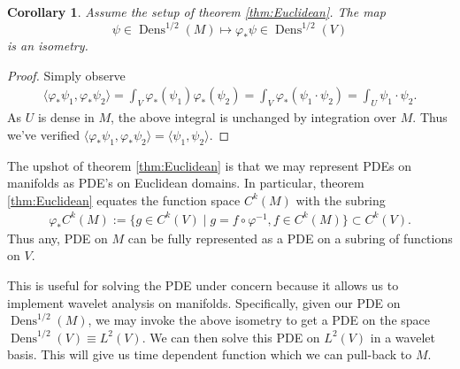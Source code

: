 \documentclass[a4paper, 12 pt]{amsart}
\newcommand{\ram}[1]{\todo[inline,color=red!20]{#1}}
\newcommand{\R}{\mathbb{R}}
\newtheorem{thm}{Theorem}[section]
\newtheorem{cor}[thm]{Corollary}
\DeclareMathOperator{\Dens}{Dens}
\begin{document}
  \begin{cor}
    Assume the setup of theorem \ref{thm:Euclidean}.
    The map 
    	\[
    		\psi \in \Dens^{1/2}(M) \mapsto \varphi_* \psi \in \Dens^{1/2}(V)
	\]
    is an isometry.
  \end{cor}
  \begin{proof}
    Simply observe
    \begin{align*}
      \langle \varphi_*\psi_1 , \varphi_*\psi_2 \rangle
      = \int_V \varphi_*(\psi_1) \varphi_*(\psi_2) 
      = \int_V \varphi_*( \psi_1 \cdot \psi_2) 
      = \int_U \psi_1 \cdot \psi_2.
    \end{align*}
    As $U$ is dense in $M$, the above integral is unchanged by integration
    over $M$.   Thus we've verified $\langle \varphi_* \psi_1,\varphi_*\psi_2 \rangle = \langle \psi_1,\psi_2 \rangle$.
  \end{proof}

  The upshot of theorem \ref{thm:Euclidean} is that we may represent PDEs on manifolds
  as PDE's on Euclidean domains.
  In particular, theorem \ref{thm:Euclidean} equates the function
  space $C^k(M)$ with the subring
  \begin{align*}
    \varphi_*C^k(M) := \{ g \in C^k(V) \mid g = f \circ \varphi^{-1} , f \in C^k(M) \} \subset C^k(V).
  \end{align*}
  Thus any, PDE on $M$ can be fully represented as a PDE on a 
  subring of functions on $V$. 
  
  This is useful for solving the PDE under concern because it allows
  us to implement wavelet analysis on manifolds.
  Specifically, given our PDE on $\Dens^{1/2}(M)$,
  we may invoke the above isometry to get a PDE
  on the space $\Dens^{1/2}(V) \equiv L^2(V)$.
  We can then solve this PDE on $L^2(V)$ in a wavelet
  basis.  This will give us time dependent 
  function which we can pull-back to $M$.

\end{document}
